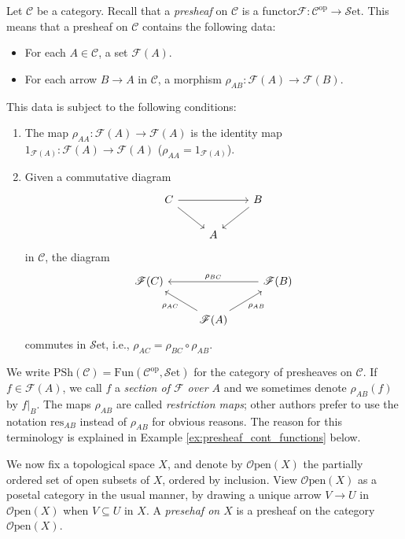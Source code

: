 \documentclass[10pt,oneside]{book}
\def\~#1{\mathscr{#1}}
\newcommand{\op}{\mathrm{op}}
\newcommand{\PSh}{\mathrm{PSh}}
\newcommand{\Fun}{\mathrm{Fun}}
\newcommand{\Set}{\~S\mathrm{et}}
\newcommand{\Open}{\~{O}\mathrm{pen}}
\theoremstyle{plain}
\theoremstyle{definition}
\theoremstyle{remark}
\numberwithin{equation}{section}
\numberwithin{figure}{section}
\begin{document}
Let $\~C$ be a category. Recall that a \textit{presheaf} on $\~C$ is a functor$\~F: \~C^\op \to \Set$. This means that a presheaf on $\~C$ contains the following data:
\begin{itemize}
\item For each $A \in \~C$, a set $\~F(A)$.
\item For each arrow $B \to A$ in $\~C$, a morphism $\rho_{AB}: \~F(A) \to \~F(B)$.
\end{itemize}
This data is subject to the following conditions:
\begin{enumerate}[label=(\roman*)]
\item The map $\rho_{AA}: \~{F}(A) \to \~{F}(A)$ is the identity map $1_{\~{F}(A)}: \~{F}(A) \to \~{F}(A)$ ($\rho_{AA} = 1_{\~{F}(A)}$).
\item Given a commutative diagram
\[\begin{tikzcd}
        C && {B} \\
        & {A}
        \arrow[from=1-1, to=1-3]
        \arrow[from=1-3, to=2-2]
        \arrow[from=1-1, to=2-2]
    \end{tikzcd}\]
in $\~C$, the diagram
\[\begin{tikzcd}
    {\~{F}(C)} && {\~{F}(B)} \\
    & {\~{F}(A)}
    \arrow["{\rho_{AC}}", from=2-2, to=1-1]
    \arrow["{\rho_{BC}}"', from=1-3, to=1-1]
    \arrow["{\rho_{AB}}"', from=2-2, to=1-3]
\end{tikzcd}\]
commutes in $\Set$, i.e., $\rho_{AC} = \rho_{BC} \circ \rho_{AB}$.
\end{enumerate}
We write $\PSh(\~C) = \Fun(\~C^\op, \Set)$ for the category of presheaves on $\~C$. If $f \in \~{F}(A)$, we call $f$ a \emph{section of $\~{F}$ over $A$} and we sometimes denote $\rho_{AB}(f)$ by $f|_B$. The maps $\rho_{AB}$ are called \emph{restriction maps}; other authors prefer to use the notation $\mathrm{res}_{AB}$ instead of $\rho_{AB}$ for obvious reasons. The reason for this terminology is explained in Example \ref{ex:presheaf_cont_functions} below.

We now fix a topological space $X$, and denote by $\Open(X)$ the partially ordered set of open subsets of $X$, ordered by inclusion. View $\Open(X)$ as a posetal category in the usual manner, by drawing a unique arrow $V \to U$ in $\Open(X)$ when $V \subseteq U$ in $X$. A \emph{presehaf on $X$} is a presheaf on the category $\Open(X)$. 
\end{document}
